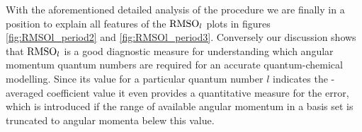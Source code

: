 %



With the aforementioned detailed analysis of the \UHF procedure
we are finally in a position to explain all features of the $\text{RMSO}_l$ plots
in figures \ref{fig:RMSOl_period2} and \ref{fig:RMSOl_period3}.
Conversely our discussion shows that $\text{RMSO}_l$ is a good diagnostic measure
for understanding which angular momentum quantum numbers
are required for an accurate quantum-chemical modelling.
Since its value for a particular quantum number $l$ indicates
the \RMS-averaged coefficient value
it even provides a quantitative measure for the error,
which is introduced if the range of available angular momentum in a \CS basis set
is truncated to angular momenta belew this value.

%
%

%
%

